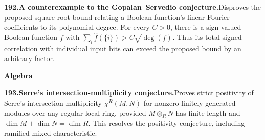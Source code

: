 \documentclass[11pt,a4paper]{article}
\begin{document}
  \par \begin{minipage}{\linewidth}
  \fontsize{10.5}{12.6}\selectfont\RaggedRight
  \hypertarget{result 192}{}
  {\bfseries\textcolor{muted}{192.}\enspace A counterexample to the Gopalan--Servedio conjecture.}\enspace Disproves the proposed square-root bound relating a Boolean function's linear Fourier coefficients to its polynomial degree. For every $C>0$, there is a sign-valued Boolean function $f$ with $\sum_i\widehat f(\{i\})>C\sqrt{\deg(f)}$. Thus its total signed correlation with individual input bits can exceed the proposed bound by an arbitrary factor.\par
  \end{minipage}\par\vspace{5pt}



  \par{}\addvspace{12pt}
  \hypertarget{subject 2}{}\label{subject 2}
  {\fontsize{15}{18}\selectfont\bfseries Algebra\par}
  \nobreak\vspace{9pt}\nobreak



  \par \begin{minipage}{\linewidth}
  \fontsize{10.5}{12.6}\selectfont\RaggedRight
  \hypertarget{result 193}{}
  {\bfseries\textcolor{muted}{193.}\enspace Serre's intersection-multiplicity conjecture.}\enspace Proves strict positivity of Serre's intersection multiplicity $\chi^R(M,N)$ for nonzero finitely generated modules over any regular local ring, provided $M\otimes_R N$ has finite length and $\dim M+\dim N=\dim R$. This resolves the positivity conjecture, including ramified mixed characteristic.\par
  \end{minipage}\par\vspace{5pt}
\end{document}
